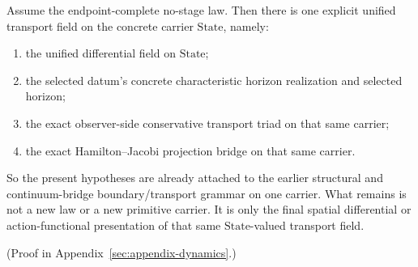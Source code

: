 \begin{corollary}
\label{cor:endpoint-complete-no-stage-law-already-yields-one-unified-transport-field}
Assume the endpoint-complete no-stage law. Then there is one explicit
unified transport field on the concrete carrier \(\mathrm{State}\),
namely:
\begin{enumerate}[label=(\roman*), leftmargin=2em, itemsep=0.2em]
\item the unified differential field on \(\mathrm{State}\);
\item the selected datum's concrete characteristic horizon realization and
      selected horizon;
\item the exact observer-side conservative transport triad on that same
      carrier;
\item the exact Hamilton--Jacobi projection bridge on that same carrier.
\end{enumerate}
So the present hypotheses are already attached to the earlier structural and
continuum-bridge boundary/transport grammar on one carrier. What remains is not a
new law or a new primitive carrier. It is only the final spatial differential
or action-functional presentation of that same \(\mathrm{State}\)-valued
transport field.
\end{corollary}

(Proof in Appendix~\ref{sec:appendix-dynamics}.)

